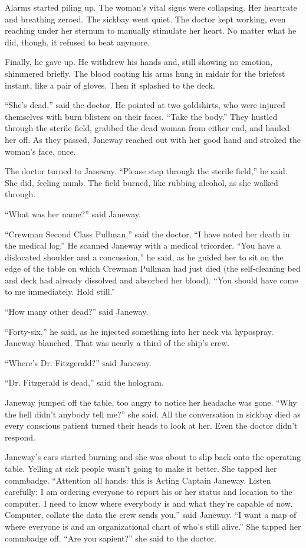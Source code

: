 \documentclass[twoside,letterpaper,12pt]{memoir}
\begin{document}
Alarms started piling up. The woman's vital signs were collapsing. Her heartrate and breathing zeroed. The sickbay went quiet. The doctor kept working, even reaching under her sternum to manually stimulate her heart. No matter what he did, though, it refused to beat anymore.

Finally, he gave up. He withdrew his hands and, still showing no emotion, shimmered briefly. The blood coating his arms hung in midair for the briefest instant, like a pair of gloves. Then it splashed to the deck.

``She's dead,'' said the doctor. He pointed at two goldshirts, who were injured themselves with burn blisters on their faces. ``Take the body.'' They hustled through the sterile field, grabbed the dead woman from either end, and hauled her off. As they passed, Janeway reached out with her good hand and stroked the woman's face, once.

The doctor turned to Janeway. ``Please step through the sterile field,'' he said. She did, feeling numb. The field burned, like rubbing alcohol, as she walked through.

``What was her name?'' said Janeway.

``Crewman Second Class Pullman,'' said the doctor. ``I have noted her death in the medical log.'' He scanned Janeway with a medical tricorder. ``You have a dislocated shoulder and a concussion,'' he said, as he guided her to sit on the edge of the table on which Crewman Pullman had just died (the self-cleaning bed and deck had already dissolved and absorbed her blood). ``You should have come to me immediately. Hold still.''

``How many other dead?'' said Janeway.

``Forty-six,'' he said, as he injected something into her neck via hypospray. Janeway blanched. That was nearly a third of the ship's crew.

``Where's Dr. Fitzgerald?'' said Janeway.

``Dr. Fitzgerald is dead,'' said the hologram.

Janeway jumped off the table, too angry to notice her headache was gone. ``Why the hell didn't anybody tell me?'' she said. All the conversation in sickbay died as every conscious patient turned their heads to look at her. Even the doctor didn't respond.

Janeway's ears started burning and she was about to slip back onto the operating table. Yelling at sick people wasn't going to make it better. She tapped her commbadge. ``Attention all hands: this is Acting Captain Janeway. Listen carefully: I am ordering everyone to report his or her status and location to the computer. I need to know where everybody is and what they're capable of now. Computer, collate the data the crew sends you,'' said Janeway. ``I want a map of where everyone is and an organizational chart of who's still alive.'' She tapped her commbadge off. ``Are you sapient?'' she said to the doctor.
\end{document}
